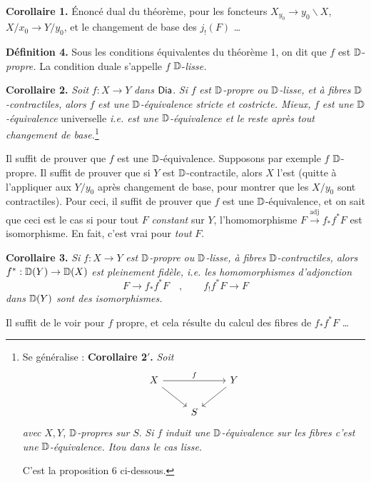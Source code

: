 \noindent\textbf{Corollaire 1.} Énoncé dual du théorème, pour les foncteurs $X_{y_0} \to y_0\backslash X$, $X/x_0 \to Y/y_0$, et le changement de base des $j_!(F)$ \ldots

\noindent\textbf{Définition 4.} Sous les conditions équivalentes du théorème 1, on dit que $f$ est $\mathbb{D}$-\textit{propre.} La condition duale s'appelle $f$ $\mathbb{D}$-\textit{lisse.}

\noindent\textbf{Corollaire 2.} \textit{Soit} $f : X \to Y$ \textit{dans} $\mathsf{Dia}$. \textit{Si} $f$ \textit{est} $\mathbb{D}$\textit{-propre ou} $\mathbb{D}$\textit{-lisse, et à fibres} $\mathbb{D}$\textit{-contractiles, alors} $f$ \textit{est une} $\mathbb{D}$\textit{-équivalence stricte et costricte. Mieux,} $f$ \textit{est une} $\mathbb{D}$\textit{-équivalence} universelle \textit{i.e. est une} $\mathbb{D}$\textit{-équivalence et le reste après tout changement de base.}\footnote[31]{Se généralise : \textbf{Corollaire 2$'$.} \textit{Soit}
\[
\begin{tikzcd}[ampersand replacement=\&]
X \arrow[rr, "f"] \arrow[dr] \& \& Y \arrow[dl] \\
\& S \&
\end{tikzcd}
\]
\textit{avec} $X, Y$, $\mathbb{D}$\textit{-propres sur} $S$. \textit{Si} $f$ \textit{induit une} $\mathbb{D}$\textit{-équivalence sur les fibres c'est une} $\mathbb{D}$\textit{-équivalence. Itou dans le cas lisse.}\par
C'est la proposition 6 ci-dessous.}


\noindent Il suffit de prouver que $f$ est une $\mathbb{D}$-équivalence. Supposons par exemple $f$ $\mathbb{D}$-propre. Il suffit de prouver que si $Y$ est $\mathbb{D}$-contractile, alors $X$ l'est (quitte à l'appliquer aux $Y/y_0$ après changement de base, pour montrer que les $X/y_0$ sont contractiles). Pour ceci, il suffit de prouver que $f$ est une $\mathbb{D}$-équivalence, et on sait que ceci est le cas si pour tout $F$ \textit{constant} sur $Y$, l'homomorphisme $F \overset{\text{adj}}{\longrightarrow} f_*f^*F$ est isomorphisme. En fait, c'est vrai pour \textit{tout} $F$.

\noindent\textbf{Corollaire 3.} \textit{Si} $f : X \to Y$ \textit{est} $\mathbb{D}$\textit{-propre ou} $\mathbb{D}$\textit{-lisse, à fibres} $\mathbb{D}$\textit{-contractiles, alors} $f^* : \mathbb{D}(Y) \to \mathbb{D}(X)$ \textit{est pleinement fidèle, i.e. les homomorphismes d'adjonction}
\[
F \longrightarrow f_*f^*F \quad , \qquad f_!f^*F \longrightarrow F
\]
\textit{dans} $\mathbb{D}(Y)$ \textit{sont des isomorphismes.}

\noindent Il suffit de le voir pour $f$ propre, et cela résulte du calcul des fibres de $f_*f^*F$ \ldots

